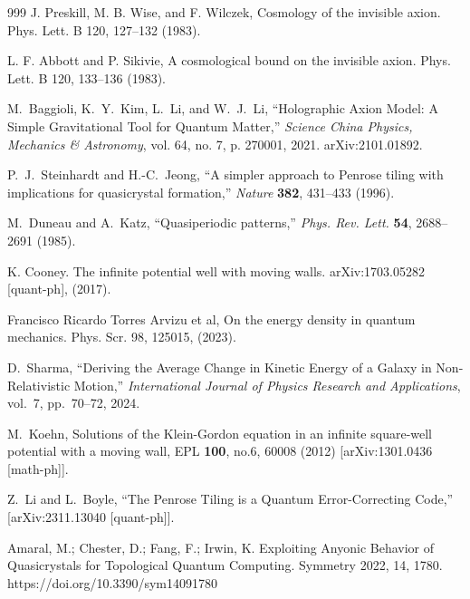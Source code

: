\documentclass[sn-mathphys-num]{sn-jnl}%
\begin{document}
\begin{thebibliography}{999}
    J. Preskill, M. B. Wise, and F. Wilczek, Cosmology of the invisible axion. Phys. Lett. B 120, 127–132 (1983).
    
    L. F. Abbott and P. Sikivie, A cosmological bound on the invisible axion. Phys. Lett. B 120, 133–136 (1983).

    M.~Baggioli, K.~Y.~Kim, L.~Li, and W.~J.~Li, ``Holographic Axion Model: A Simple Gravitational Tool for Quantum Matter,'' \emph{Science China Physics, Mechanics \& Astronomy}, vol. 64, no. 7, p. 270001, 2021. {arXiv:2101.01892}.

    P.~J.~Steinhardt and H.-C.~Jeong, ``A simpler approach to Penrose tiling with implications for quasicrystal formation,'' \textit{Nature} \textbf{382}, 431–433 (1996).

    M.~Duneau and A.~Katz, ``Quasiperiodic patterns,'' \textit{Phys. Rev. Lett.} \textbf{54}, 2688–2691 (1985).

    K. Cooney. The infinite potential well with moving walls. arXiv:1703.05282 [quant-ph], (2017).

    Francisco Ricardo Torres Arvizu et al, On the energy density in quantum mechanics. Phys. Scr. 98, 125015, (2023).

 D.~Sharma, ``Deriving the Average Change in Kinetic Energy of a Galaxy in Non-Relativistic Motion,''       \textit{International Journal of Physics Research and Applications}, vol.~7, pp.~70--72, 2024.

    M.~Koehn,
    Solutions of the Klein-Gordon equation in an infinite square-well potential with a moving wall,
    EPL \textbf{100}, no.6, 60008 (2012)
    [arXiv:1301.0436 [math-ph]].

    Z.~Li and L.~Boyle,
    ``The Penrose Tiling is a Quantum Error-Correcting Code,''
    [arXiv:2311.13040 [quant-ph]].
    
    Amaral, M.; Chester, D.; Fang, F.; Irwin, K. Exploiting Anyonic Behavior of Quasicrystals for Topological Quantum Computing. Symmetry 2022, 14, 1780. https://doi.org/10.3390/sym14091780
    

\end{thebibliography}
\end{document}
